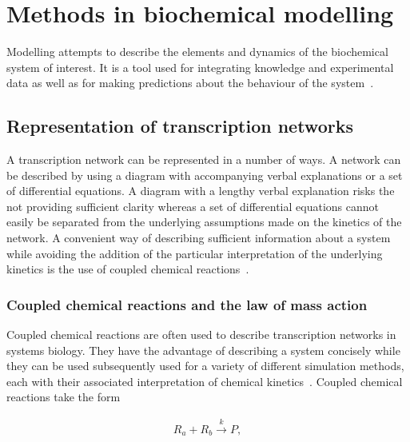 


\section{Methods in biochemical modelling}

Modelling attempts to describe the elements and dynamics of the biochemical system of interest. It is a tool used for integrating knowledge and experimental data as well as for making predictions about the behaviour of the system~\autocite{Wilkinson:2006td}. 


\subsection{Representation of transcription networks}
A transcription network can be represented in a number of ways. A network can be described by using a diagram with accompanying verbal explanations or a set of differential equations. A diagram with a lengthy verbal explanation risks the not providing sufficient clarity whereas a set of differential equations cannot easily be separated from the underlying assumptions made on the kinetics of the network. A convenient way of describing sufficient information about a system while avoiding the addition of the particular interpretation of the underlying kinetics is the use of coupled chemical reactions~\autocite{Wilkinson:2006td}. 

\subsubsection{Coupled chemical reactions and the law of mass action}

Coupled chemical reactions are often used to describe transcription networks in systems biology. They have the advantage of describing a system concisely while they can be used subsequently used for a variety of different simulation methods, each with their associated interpretation of chemical kinetics~\autocite{Wilkinson:2006td}. Coupled chemical reactions take the form


\begin{align}
	R_a + R_b \xrightarrow{k} P, \label{eq:example_eq}
\end{align}

